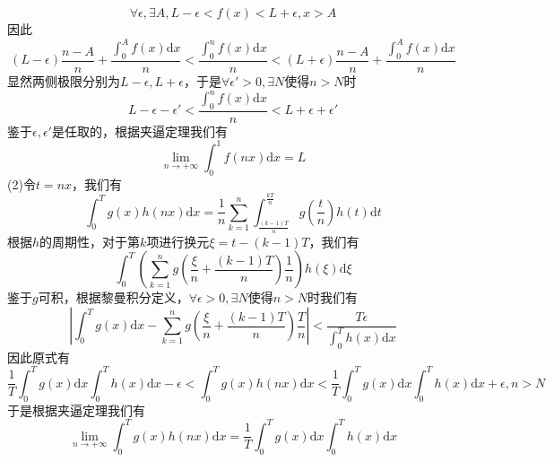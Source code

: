 \documentclass[utf8]{ctexart}
\begin{document}
\[\forall\epsilon,\exists A,L-\epsilon<f(x)<L+\epsilon,x>A\]
因此
\[(L-\epsilon)\frac{n-A}{n}+\frac{\int_{0}^{A}f(x)\mathrm{d}x}{n}<\frac{\int_{0}^{n}f(x)\mathrm{d}x}{n}<(L+\epsilon)\frac{n-A}{n}+\frac{\int_{0}^{A}f(x)\mathrm{d}x}{n}\]
显然两侧极限分别为$L-\epsilon,L+\epsilon$，于是$\forall\epsilon'>0,\exists N$使得$n>N$时
\[L-\epsilon-\epsilon'<\frac{\int_{0}^{n}f(x)\mathrm{d}x}{n}<L+\epsilon+\epsilon'\]
鉴于$\epsilon,\epsilon'$是任取的，根据夹逼定理我们有
\[\lim_{n\rightarrow+\infty}\int_{0}^{1}f(nx)\mathrm{d}x=L\]
(2)令$t=nx$，我们有
\[\int_{0}^{T}g(x)h(nx)\mathrm{d}x=\frac{1}{n}\sum_{k=1}^{n}\int_{\frac{(k-1)T}{n}}^{\frac{kT}{n}}g(\frac{t}{n})h(t)\mathrm{d}t\]
根据$h$的周期性，对于第$k$项进行换元$\xi=t-(k-1)T$，我们有
\[\int_{0}^{T}(\sum_{k=1}^{n}g(\frac{\xi}{n}+\frac{(k-1)T}{n})\frac{1}{n})h(\xi)\mathrm{d}\xi\]
鉴于$g$可积，根据黎曼积分定义，$\forall\epsilon>0,\exists N$使得$n>N$时我们有
\[|\int_{0}^{T}g(x)\mathrm{d}x-\sum_{k=1}^{n}g(\frac{\xi}{n}+\frac{(k-1)T}{n})\frac{T}{n}|<\frac{T\epsilon}{\int_{0}^{T}h(x)\mathrm{d}x}\]
因此原式有
\[\frac{1}{T}\int_{0}^{T}g(x)\mathrm{d}x\int_{0}^{T}h(x)\mathrm{d}x-\epsilon<\int_{0}^{T}g(x)h(nx)\mathrm{d}x<\frac{1}{T}\int_{0}^{T}g(x)\mathrm{d}x\int_{0}^{T}h(x)\mathrm{d}x+\epsilon,n>N\]
于是根据夹逼定理我们有
\[\lim_{n\rightarrow+\infty}\int_{0}^{T}g(x)h(nx)\mathrm{d}x=\frac{1}{T}\int_{0}^{T}g(x)\mathrm{d}x\int_{0}^{T}h(x)\mathrm{d}x\]
\end{document}
